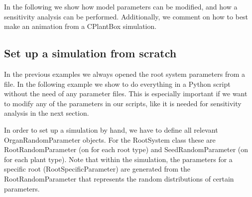 \documentclass[a4paper]{article}
\begin{document}
In the following we show how model parameters can be modified, and how a sensitivity analysis can be performed. Additionally, we comment on how to best make an animation from a CPlantBox simulation.

\subsection{Set up a simulation from scratch} \label{sec:from_scratch}

In the previous examples we always opened the root system parameters from a file. 
In the following example we show to do everything in a Python script without the need of any parameter files. 
This is especially important if we want to modify any of the parameters in our scripts, like it is needed for sensitivity analysis in the next section.

In order to set up a simulation by hand, we have to define all relevant OrganRandomParameter objects. For the RootSystem class these are RootRandomParameter (on for each root type) and SeedRandomParameter (on for each plant type). Note that within the simulation, the parameters for a specific root (RootSpecificParameter) are generated from the RootRandomParameter that represents the random distributions of certain parameters.


\end{document}
